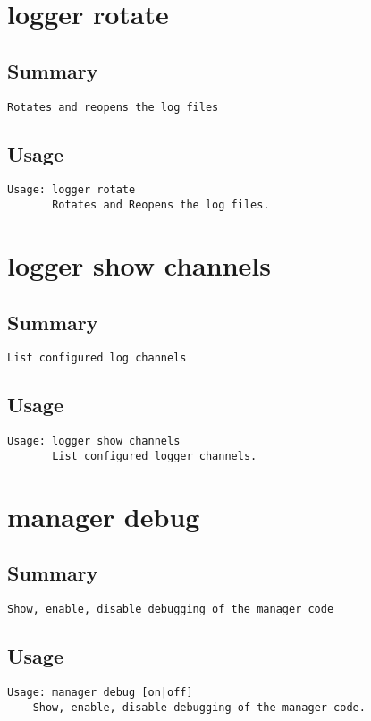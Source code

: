 \section{logger rotate}
\subsection{Summary}
\begin{verbatim}
Rotates and reopens the log files
\end{verbatim}
\subsection{Usage}
\begin{verbatim}
Usage: logger rotate
       Rotates and Reopens the log files.

\end{verbatim}


\section{logger show channels}
\subsection{Summary}
\begin{verbatim}
List configured log channels
\end{verbatim}
\subsection{Usage}
\begin{verbatim}
Usage: logger show channels
       List configured logger channels.

\end{verbatim}


\section{manager debug}
\subsection{Summary}
\begin{verbatim}
Show, enable, disable debugging of the manager code
\end{verbatim}
\subsection{Usage}
\begin{verbatim}
Usage: manager debug [on|off]
	Show, enable, disable debugging of the manager code.

\end{verbatim}


